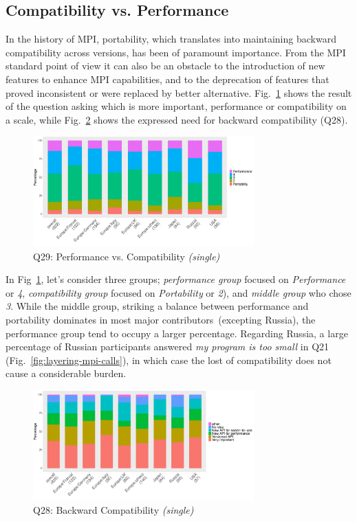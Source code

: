 \documentclass[preprint,5p,times]{elsarticle}
\def\myquote#1{{\it #1}}
\def\mcountries{major contributors\xspace{}}%
\begin{document}
\subsection{Compatibility vs. Performance}

In the history of MPI, portability, which translates into maintaining backward
compatibility across versions, has been of paramount importance. From the MPI
standard point of view it can also be an obstacle to the introduction of new
features to enhance MPI capabilities, and to the deprecation of features that
proved inconsistent or were replaced by better alternative.
Fig.~\ref{fig:performance-vs-compatibility} shows the result of the question
asking which is more important, performance or compatibility on a scale, while
Fig.~\ref{fig:compatibility} shows the expressed need for backward compatibility
(Q28).

\begin{figure}[htb]
\begin{center}
\includegraphics[width=8.5cm]{R-scripts/Q29.pdf}
\caption{Q29: Performance vs. Compatibility {\it(single)}}
\label{fig:performance-vs-compatibility}
\end{center}
\end{figure}

In Fig~\ref{fig:performance-vs-compatibility}, let's consider three groups; {\it
performance group} focused on \myquote{Performance} or \myquote{4}, {\it
compatibility group} focused on \myquote{Portability} or \myquote{2}), and {\it
middle group} who chose \myquote{3}. While the middle group, striking a balance
between performance and portability dominates in most \mcountries\  (excepting
Russia), the performance group tend to occupy a larger percentage. Regarding
Russia, a large percentage of Russian participants answered \myquote{my program
is too small} in Q21 (Fig.~\ref{fig:layering-mpi-calls}), in which case the lost
of compatibility does not cause a considerable burden.

\begin{figure}[htb]
\begin{center}
\includegraphics[width=8.5cm]{R-scripts/Q28.pdf}
\caption{Q28: Backward Compatibility {\it(single)}}
\label{fig:compatibility}
\end{center}
\end{figure}
\end{document}
